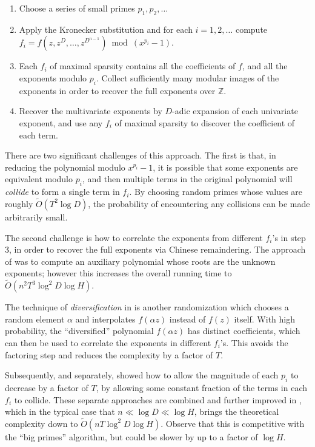 \documentclass[letterpaper,10pt]{article}
\def\cite{\citep}
\newcommand{\ZZ}{\ensuremath{\mathbb{Z}}}
\newcommand{\softoh}{\ensuremath{\widetilde{O}}}
\begin{document}
\begin{enumerate}
  \item Choose a series of small primes $p_1, p_2, \ldots$
  \item Apply the Kronecker substitution and for each $i=1,2,\ldots$
    compute $f_i = f(z,z^D,\ldots,z^{D^{n-1}}) \bmod (x^{p_i}-1)$.
  \item Each $f_i$ of maximal sparsity contains all the coefficients of
    $f$, and all the exponents modulo $p_i$. Collect sufficiently many
    modular images of the exponents in order to recover the full
    exponents over $\ZZ$.
  \item Recover the multivariate exponents by $D$-adic expansion of each
    univariate exponent, and use any $f_i$ of maximal sparsity to
    discover the coefficient of each term.
\end{enumerate}

There are two significant challenges of this approach. The first is
that, in reducing the polynomial modulo $x^{p_i}-1$, it is possible that
some exponents are equivalent modulo $p_i$, and then multiple terms in
the original polynomial will \emph{collide} to form a single term in
$f_i$. By choosing random primes whose values are roughly
$\softoh(T^2\log D)$, the probability of encountering any collisions can
be made arbitrarily small.

The second challenge is how to correlate the exponents from different
$f_i$'s in step 3, in order to recover the full exponents via Chinese
remaindering. The approach of \cite{GS09} was to compute an auxiliary
polynomial whose roots are the unknown exponents; however this
increases the overall running time to $\softoh(n^2 T^3 \log^2 D \log
H)$.

The technique of \emph{diversification} in \cite{GR11a} is another
randomization which chooses a random element $\alpha$ and interpolates
$f(\alpha z)$ instead of $f(z)$ itself. With high probability, the
``diversified'' polynomial $f(\alpha z)$ has distinct coefficients,
which can then be used to correlate the exponents in different $f_i$'s.
This avoids the factoring step and reduces the complexity by a factor of
$T$.

Subsequently, and separately, \cite{AGR13} showed how to allow the
magnitude of each $p_i$ to decrease by a factor of $T$, by allowing some
constant fraction of the terms in each $f_i$ to collide. These separate
approaches are combined and further improved in \cite{AGR15},
which in the typical case that
$n \ll \log D \ll \log H$, brings the theoretical complexity down to
$\softoh(nT \log^2 D \log H)$. Observe that this is competitive with the
``big primes'' algorithm, but could be slower by up to a factor of
$\log H$. 
\end{document}
